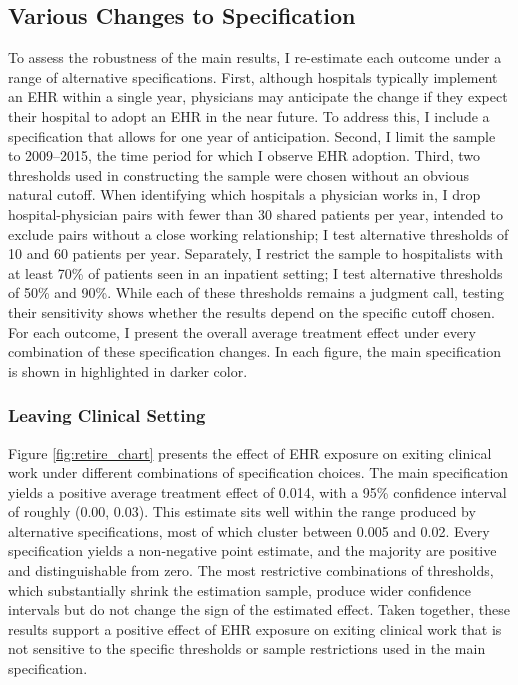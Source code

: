 \documentclass[12pt]{article}
\begin{document}



\subsection{Various Changes to Specification}\label{sec:changes}

To assess the robustness of the main results, I re-estimate each outcome under a range of alternative specifications. First, although hospitals typically implement an EHR within a single year, physicians may anticipate the change if they expect their hospital to adopt an EHR in the near future. To address this, I include a specification that allows for one year of anticipation. Second, I limit the sample to 2009--2015, the time period for which I observe EHR adoption. Third, two thresholds used in constructing the sample were chosen without an obvious natural cutoff. When identifying which hospitals a physician works in, I drop hospital-physician pairs with fewer than 30 shared patients per year, intended to exclude pairs without a close working relationship; I test alternative thresholds of 10 and 60 patients per year. Separately, I restrict the sample to hospitalists with at least 70\% of patients seen in an inpatient setting; I test alternative thresholds of 50\% and 90\%. While each of these thresholds remains a judgment call, testing their sensitivity shows whether the results depend on the specific cutoff chosen. For each outcome, I present the overall average treatment effect under every combination of these specification changes. In each figure, the main specification is shown in highlighted in darker color. 

\subsubsection{Leaving Clinical Setting}

Figure \ref{fig:retire_chart} presents the effect of EHR exposure on exiting clinical work under different combinations of specification choices. The main specification yields a positive average treatment effect of 0.014, with a 95\% confidence interval of roughly (0.00, 0.03). This estimate sits well within the range produced by alternative specifications, most of which cluster between 0.005 and 0.02. Every specification yields a non-negative point estimate, and the majority are positive and distinguishable from zero. The most restrictive combinations of thresholds, which substantially shrink the estimation sample, produce wider confidence intervals but do not change the sign of the estimated effect. Taken together, these results support a positive effect of EHR exposure on exiting clinical work that is not sensitive to the specific thresholds or sample restrictions used in the main specification.
\end{document}
